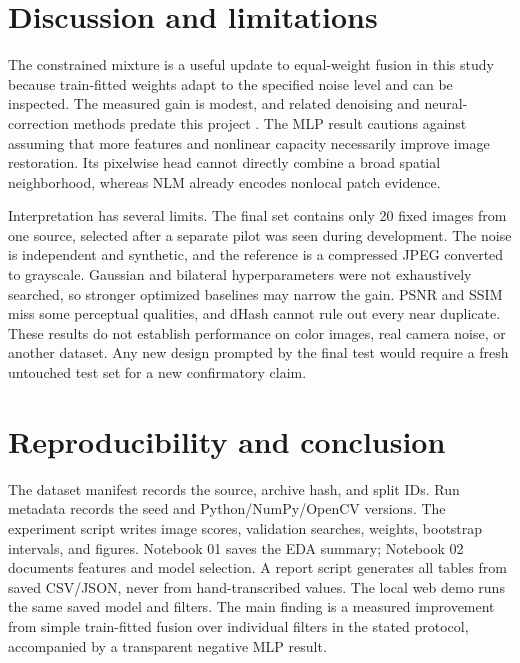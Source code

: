 \documentclass[11pt,a4paper]{article}
\begin{document}
\section{Discussion and limitations}
The constrained mixture is a useful update to equal-weight fusion in this study because train-fitted weights adapt to the specified noise level and can be inspected. The measured gain is modest, and related denoising and neural-correction methods predate this project \cite{buades2005,zhang2017,guo2021}. The MLP result cautions against assuming that more features and nonlinear capacity necessarily improve image restoration. Its pixelwise head cannot directly combine a broad spatial neighborhood, whereas NLM already encodes nonlocal patch evidence.

Interpretation has several limits. The final set contains only 20 fixed images from one source, selected after a separate pilot was seen during development. The noise is independent and synthetic, and the reference is a compressed JPEG converted to grayscale. Gaussian and bilateral hyperparameters were not exhaustively searched, so stronger optimized baselines may narrow the gain. PSNR and SSIM miss some perceptual qualities, and dHash cannot rule out every near duplicate. These results do not establish performance on color images, real camera noise, or another dataset. Any new design prompted by the final test would require a fresh untouched test set for a new confirmatory claim.

\section{Reproducibility and conclusion}
The dataset manifest records the source, archive hash, and split IDs. Run metadata records the seed and Python/NumPy/OpenCV versions. The experiment script writes image scores, validation searches, weights, bootstrap intervals, and figures. Notebook 01 saves the EDA summary; Notebook 02 documents features and model selection. A report script generates all tables from saved CSV/JSON, never from hand-transcribed values. The local web demo runs the same saved model and filters. The main finding is a measured improvement from simple train-fitted fusion over individual filters in the stated protocol, accompanied by a transparent negative MLP result.
\end{document}
